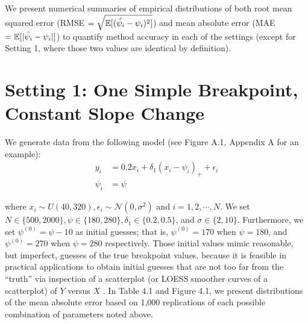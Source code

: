 \documentclass [12pt, proquest] {uwthesis}[2016/11/22]
\begin{document}
We present numerical summaries of empirical distributions of both root mean squared error (RMSE $=\sqrt{\mathbb{E}[(\Hat{\psi_i} - \psi_i)^2]}$) and mean absolute error (MAE $=\mathbb{E}[\lvert \Hat{\psi_i} - \psi_i \rvert]$) to quantify method accuracy in each of the settings (except for Setting 1, where those two values are identical by definition). 

\section{Setting 1: One Simple Breakpoint, Constant Slope Change}
 We generate data from the following model (see Figure A.1, Appendix A for an example):
\begin{align*}
    y_i &= 0.2 x_i + \delta_1 (x_i - \psi_i)_+ + \epsilon_i \\
    \psi_i &= \psi
\end{align*}

where $x_i \sim U(40, 320), \epsilon_i \sim \mathcal{N}(0, \sigma^2)$ and $i = 1, 2, \cdots, N$. We set $N \in \{500, 2000\}, \psi \in \{180, 280\}, \delta_1 \in \{0.2, 0.5\}$, and $\sigma \in \{2, 10\}$. Furthermore, we set $\psi^{(0)} = \psi - 10$ as initial guesses; that is, $\psi^{(0)} = 170$ when $\psi = 180$, and $\psi^{(0)} = 270$ when $\psi = 280$ respectively. Those initial values mimic reasonable, but imperfect, guesses of the true breakpoint values, because it is feasible in practical applications to obtain initial guesses that are not too far from the ``truth'' via inspection of a scatterplot (or LOESS smoother curves of a scatterplot) of $Y$ versus $X$ \cite{VM2003, VM2014}. In Table 4.1 and Figure 4.1, we present distributions of the mean absolute error based on 1,000 replications of each possible combination of parameters noted above.
\end{document}
